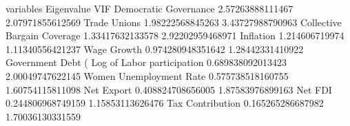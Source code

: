 variables	Eigenvalue	VIF
Democratic Governance	2.57263888111467	2.07971855612569
Trade Unions	1.98222568845263	3.43727988790963
Collective Bargain Coverage	1.33417632133578	2.92202959468971
Inflation	1.214606719974	1.11340556421237
Wage Growth	0.974280948351642	1.28442331410922
Government Debt (%
Log of Labor participation	0.689838092013423	2.00049747622145
Women Unemployment Rate	0.575738518160755	1.60754115811098
Net Export	0.408824708656005	1.87583976899163
Net FDI	0.244806968749159	1.15853113626476
Tax Contribution	0.165265286687982	1.70036130331559

